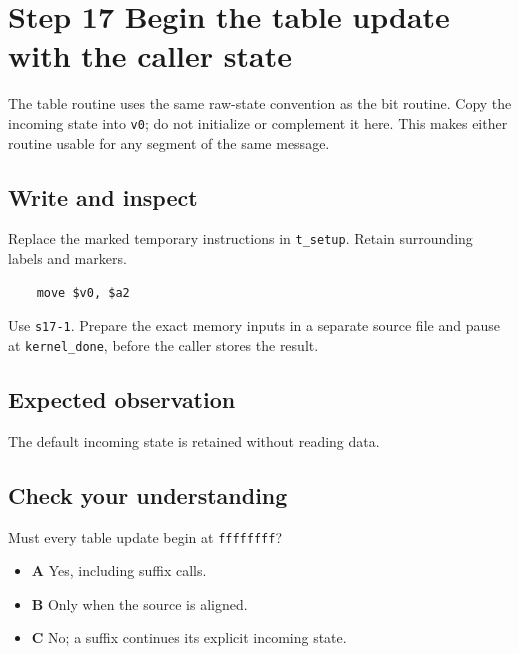 \section{Step 17 Begin the table update with the caller state}\label{crc-s17}

The table routine uses the same raw-state convention as the bit routine. Copy the incoming state into \texttt{v0}; do not initialize or complement it here. This makes either routine usable for any segment of the same message.

\subsection{Write and inspect}
Replace the marked temporary instructions in \texttt{t\_setup}. Retain surrounding labels and markers.

\begin{verbatim}
    move $v0, $a2
\end{verbatim}

Use \texttt{s17-1}. Prepare the exact memory inputs in a separate source file and pause at \texttt{kernel\_done}, before the caller stores the result.

\subsection{Expected observation}
The default incoming state is retained without reading data.

\subsection{Check your understanding}
Must every table update begin at \texttt{ffffffff}?

\begin{itemize}
  \item \textbf{A} Yes, including suffix calls.
  \item \textbf{B} Only when the source is aligned.
  \item \textbf{C} No; a suffix continues its explicit incoming state.
\end{itemize}
